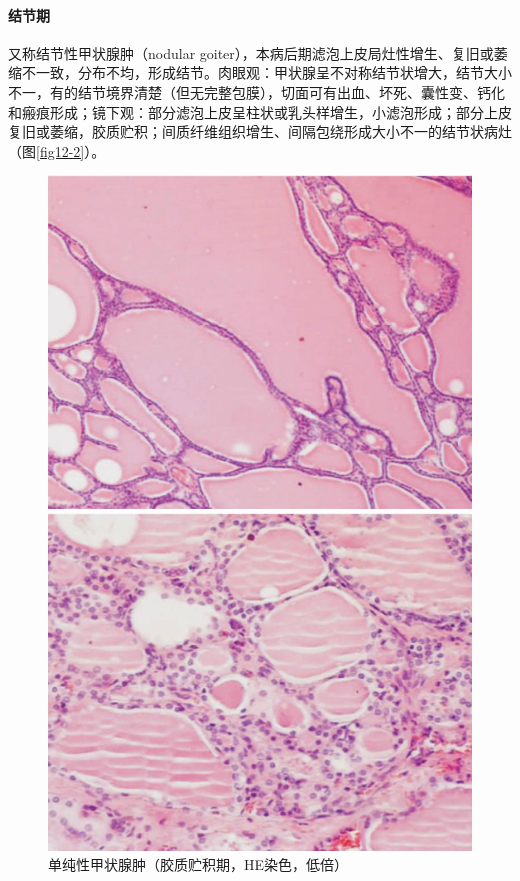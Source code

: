 \paragraph{结节期}
又称结节性甲状腺肿（nodular
goiter），本病后期滤泡上皮局灶性增生、复旧或萎缩不一致，分布不均，形成结节。肉眼观：甲状腺呈不对称结节状增大，结节大小不一，有的结节境界清楚（但无完整包膜），切面可有出血、坏死、囊性变、钙化和瘢痕形成；镜下观：部分滤泡上皮呈柱状或乳头样增生，小滤泡形成；部分上皮复旧或萎缩，胶质贮积；间质纤维组织增生、间隔包绕形成大小不一的结节状病灶（图\ref{fig12-2}）。


  \begin{figure}[!htbp]
	\centering
	\begin{minipage}[b]{0.45\textwidth}
		\includegraphics{./images/Image00208.jpg}
 \captionsetup{justification=centering}
 \caption{单纯性甲状腺肿（胶质贮积期，HE染色，低倍）}
 \label{fig12-1}
	\end{minipage}
	\hspace{0.04\textwidth}%
	\begin{minipage}[b]{0.45\textwidth}
		\includegraphics{./images/Image00209.jpg}

\end{minipage}
\end{figure}
